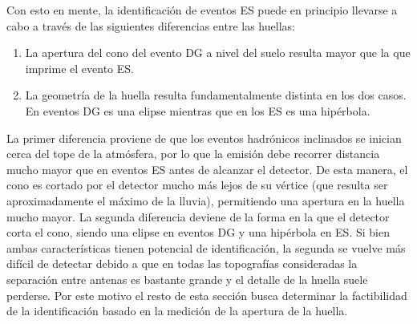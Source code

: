 	Con esto en mente, la identificaci\'on de eventos ES puede en principio llevarse a cabo a trav\'es de las siguientes diferencias entre las huellas:
	\begin{enumerate}
	 \item La apertura del cono del evento DG a nivel del suelo resulta mayor que la que imprime el evento ES.
	 \item La geometr\'ia de la huella resulta fundamentalmente distinta en los dos casos. En eventos DG es una elipse mientras que en los ES es una hip\'erbola.
	\end{enumerate}

	La primer diferencia proviene de que los eventos hadr\'onicos inclinados se inician cerca del tope de la atm\'osfera, por lo que la emisi\'on debe recorrer distancia mucho mayor que en eventos ES antes de alcanzar el detector.
	De esta manera, el cono \cher{} es cortado por el detector mucho m\'as lejos de su v\'ertice (que resulta ser aproximadamente el m\'aximo de la lluvia), permitiendo una apertura en la huella mucho mayor.
	La segunda diferencia deviene de la forma en la que el detector corta el cono, siendo una elipse en eventos DG y una hip\'erbola en ES.
	Si bien ambas caracter\'isticas tienen potencial de identificaci\'on, la segunda se vuelve m\'as dif\'icil de detectar debido a que en todas las topograf\'ias consideradas la separaci\'on entre antenas es bastante grande y el detalle de la huella suele perderse.
	Por este motivo el resto de esta secci\'on busca determinar la factibilidad de la identificaci\'on basado en la medici\'on de la apertura de la huella.
	
